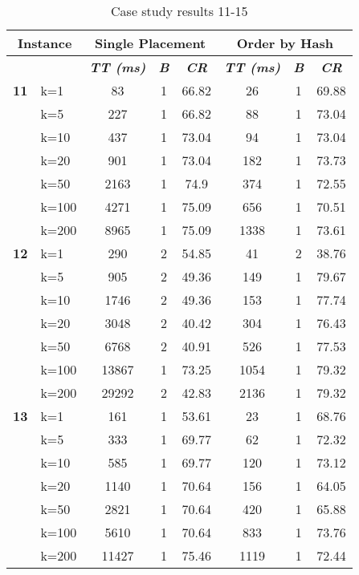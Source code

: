     \begin{table}[htbp]
    \caption{Case study results 11-15}
    \centering
    \begin{tabular}{|l|l|c|c|c|c|c|c|}
    \hline
    \multicolumn{ 2}{|c|}{\textbf{Instance}} & \multicolumn{ 3}{c|}{\textbf{Single Placement}} & \multicolumn{ 3}{c|}{\textbf{Order by Hash}} \\ \hline
    \multicolumn{ 2}{|l|}{} & \textbf{\textit{TT (ms)}} & \textbf{\textit{B}} & \textbf{\textit{CR}} & \textbf{\textit{TT (ms)}} & \textbf{\textit{B}} & \textbf{\textit{CR}} \\ \hline
    \multicolumn{1}{|r|}{\textbf{11}} & k=1 & 83 & 1 & 66.82 & 26 & 1 & 69.88 \\ 
     & k=5 & 227 & 1 & 66.82 & 88 & 1 & 73.04 \\ 
     & k=10 & 437 & 1 & 73.04 & 94 & 1 & 73.04 \\ 
     & k=20 & 901 & 1 & 73.04 & 182 & 1 & 73.73 \\ 
     & k=50 & 2163 & 1 & 74.9 & 374 & 1 & 72.55 \\ 
     & k=100 & 4271 & 1 & 75.09 & 656 & 1 & 70.51 \\ 
     & k=200 & 8965 & 1 & 75.09 & 1338 & 1 & 73.61 \\ \hline
    \multicolumn{1}{|r|}{\textbf{12}} & k=1 & 290 & 2 & 54.85 & 41 & 2 & 38.76 \\ 
     & k=5 & 905 & 2 & 49.36 & 149 & 1 & 79.67 \\ 
     & k=10 & 1746 & 2 & 49.36 & 153 & 1 & 77.74 \\ 
     & k=20 & 3048 & 2 & 40.42 & 304 & 1 & 76.43 \\ 
     & k=50 & 6768 & 2 & 40.91 & 526 & 1 & 77.53 \\ 
     & k=100 & 13867 & 1 & 73.25 & 1054 & 1 & 79.32 \\ 
     & k=200 & 29292 & 2 & 42.83 & 2136 & 1 & 79.32 \\ \hline
    \multicolumn{1}{|r|}{\textbf{13}} & k=1 & 161 & 1 & 53.61 & 23 & 1 & 68.76 \\ 
     & k=5 & 333 & 1 & 69.77 & 62 & 1 & 72.32 \\ 
     & k=10 & 585 & 1 & 69.77 & 120 & 1 & 73.12 \\ 
     & k=20 & 1140 & 1 & 70.64 & 156 & 1 & 64.05 \\ 
     & k=50 & 2821 & 1 & 70.64 & 420 & 1 & 65.88 \\ 
     & k=100 & 5610 & 1 & 70.64 & 833 & 1 & 73.76 \\ 
     & k=200 & 11427 & 1 & 75.46 & 1119 & 1 & 72.44 \\ \hline

\end{tabular}
\end{table}
